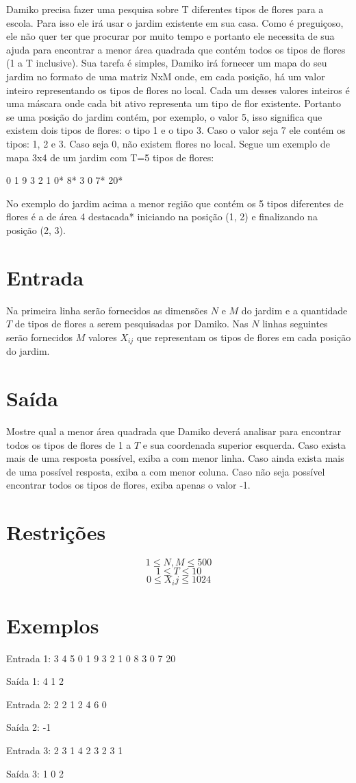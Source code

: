 Damiko precisa fazer uma pesquisa sobre T diferentes tipos de flores para a escola. Para isso ele irá usar o jardim existente em sua casa. Como é preguiçoso, ele não quer ter que procurar por muito tempo e portanto ele necessita de sua ajuda para encontrar a menor área quadrada que contém todos os tipos de flores (1 a T inclusive). 
Sua tarefa é simples, Damiko irá fornecer um mapa do seu jardim no formato de uma matriz NxM onde, em cada posição, há um valor inteiro representando os tipos de flores no local. Cada um desses valores inteiros é uma máscara onde cada bit ativo representa um tipo de flor existente.
Portanto se uma posição do jardim contém, por exemplo, o valor 5, isso significa que existem dois tipos de flores: o tipo 1 e o tipo 3. Caso o valor seja 7 ele contém os tipos:  1, 2 e 3. Caso seja 0, não existem flores no local.
Segue um exemplo de mapa 3x4 de um jardim com T=5 tipos de flores:

0 1 9 3
2 1 0*  8*
3 0 7*  20*


No exemplo do jardim acima a menor região que contém os 5 tipos diferentes de flores é a de área 4 destacada* iniciando na posição (1, 2) e finalizando na posição (2, 3).

\section*{Entrada}

Na primeira linha serão fornecidos as dimensões $N$ e $M$ do jardim e a quantidade $T$ de tipos de flores a serem pesquisadas por Damiko. Nas $N$ linhas seguintes serão fornecidos $M$ valores $X_{ij}$ que representam os tipos de flores em cada posição do jardim.

\section*{Saída}

Mostre qual a menor área quadrada que Damiko deverá analisar para encontrar todos os tipos de flores de 1 a $T$ e sua coordenada superior esquerda. Caso exista mais de uma resposta possível, exiba a com menor linha. Caso ainda exista mais de uma possível resposta, exiba a com menor coluna. Caso não seja possível encontrar todos os tipos de flores, exiba apenas o valor -1.

\section*{Restrições}

$$1 \leq N,M \leq 500$$
$$1 \leq T \leq 10$$
$$0 \leq X_ij \leq 1024$$

\section*{Exemplos}
Entrada 1:
3 4 5
0 1 9 3
2 1 0 8
3 0 7 20

Saída 1:
4
1 2

Entrada 2:
2 2 1
2 4
6 0

Saída 2:
-1

Entrada 3:
2 3 1
4 2 3
2 3 1

Saída 3:
1
0 2

\exemplo
